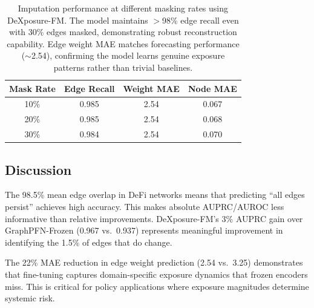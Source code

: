 \documentclass[preprint,12pt]{elsarticle}
\renewcommand{\paragraph}[1]{}
\begin{document}
\begin{table}[t]
\centering
\small
\begin{tabular}{cccc}
\hline
\textbf{Mask Rate} & \textbf{Edge Recall} & \textbf{Weight MAE} & \textbf{Node MAE} \\
\hline
10\% & 0.985 & 2.54 & 0.067 \\
20\% & 0.985 & 2.54 & 0.068 \\
30\% & 0.984 & 2.54 & 0.070 \\
\hline
\end{tabular}
\caption{Imputation performance at different masking rates using DeXposure-FM. The model maintains $>$98\% edge recall even with 30\% edges masked, demonstrating robust reconstruction capability. Edge weight MAE matches forecasting performance ($\sim$2.54), confirming the model learns genuine exposure patterns rather than trivial baselines.}
\label{tab:imputation-results}
\end{table}

\subsection{Discussion}
\label{subsec:discussion}

\paragraph{High edge overlap enables strong baselines.}
The 98.5\% mean edge overlap in DeFi networks means that predicting ``all edges persist'' achieves high accuracy. This makes absolute AUPRC/AUROC less informative than relative improvements. DeXposure-FM's 3\% AUPRC gain over GraphPFN-Frozen (0.967 vs.\ 0.937) represents meaningful improvement in identifying the 1.5\% of edges that do change.

\paragraph{Weight prediction benefits most from fine-tuning.}
The 22\% MAE reduction in edge weight prediction (2.54 vs.\ 3.25) demonstrates that fine-tuning captures domain-specific exposure dynamics that frozen encoders miss. This is critical for policy applications where exposure magnitudes determine systemic risk.
\end{document}
